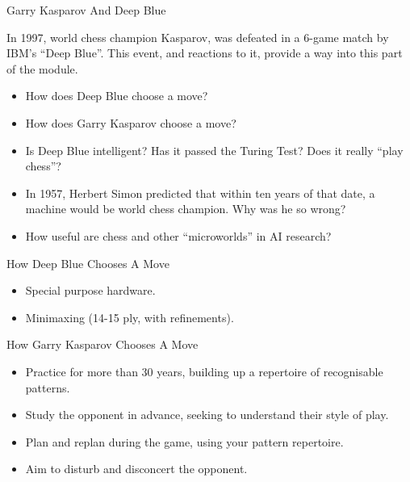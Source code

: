 \documentclass{article}
\begin{document}
\begin{slide}{}
{\Large Garry Kasparov And Deep Blue}

In 1997, world chess champion Kasparov, was defeated in a
6-game match by IBM's ``Deep Blue''. This event, and reactions to it,
provide a way into this part of the module.
\begin{itemize}
\item How does Deep Blue choose a move?
\item How does Garry Kasparov choose a move?
\item Is Deep Blue intelligent? Has it passed the Turing Test? Does it
really ``play chess''?
\item In 1957, Herbert Simon predicted that within ten years of that
date, a machine would be world chess champion. Why was he so wrong?
\item How useful are chess and other ``microworlds'' in AI research?
\end{itemize}
\end{slide}

\begin{slide}{}
{\Large How Deep Blue Chooses A Move}
\begin{itemize}
\item Special purpose hardware.
\item Minimaxing (14-15 ply, with refinements).
\end{itemize}

\begin{center}


\end{center}

\end{slide}

\begin{slide}{}
{\Large How Garry Kasparov Chooses A Move}
\begin{itemize}
\item Practice for more than 30 years, building up a repertoire of
recognisable patterns.
\item Study the opponent in advance, seeking to understand their style
of play.
\item Plan and replan during the game, using your pattern repertoire.
\item Aim to disturb and disconcert the opponent.
\end{itemize}
\end{slide}
\end{document}
